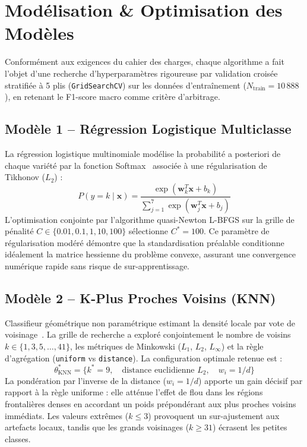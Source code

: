 \documentclass[10pt,a4paper,twocolumn]{article}
\begin{document}
\section{Modélisation \& Optimisation des Modèles}
\label{sec:models}

Conformément aux exigences du cahier des charges, chaque algorithme a fait l'objet d'une recherche d'hyperparamètres rigoureuse par validation croisée stratifiée à 5 plis (\texttt{GridSearchCV}) sur les données d'entraînement ($N_{\text{train}} = 10\,888$), en retenant le F1-score macro comme critère d'arbitrage.

\subsection{Modèle 1 -- Régression Logistique Multiclasse}
La régression logistique multinomiale modélise la probabilité a posteriori de chaque variété par la fonction Softmax~\cite{bishop2006pattern} associée à une régularisation de Tikhonov ($L_2$) :
\begin{equation}
P(y = k \mid \mathbf{x}) = \frac{\exp(\mathbf{w}_k^T \mathbf{x} + b_k)}{\sum_{j=1}^7 \exp(\mathbf{w}_j^T \mathbf{x} + b_j)}
\label{eq:softmax}
\end{equation}
L'optimisation conjointe par l'algorithme quasi-Newton L-BFGS sur la grille de pénalité $C \in \{0.01, 0.1, 1, 10, 100\}$ sélectionne $C^* = 100$. Ce paramètre de régularisation modéré démontre que la standardisation préalable conditionne idéalement la matrice hessienne du problème convexe, assurant une convergence numérique rapide sans risque de sur-apprentissage.

\subsection{Modèle 2 -- K-Plus Proches Voisins (KNN)}
Classifieur géométrique non paramétrique estimant la densité locale par vote de voisinage~\cite{cover1967nearest}. La grille de recherche a exploré conjointement le nombre de voisins $k \in \{1, 3, 5, \dots, 41\}$, les métriques de Minkowski ($L_1$, $L_2$, $L_\infty$) et la règle d'agrégation (\texttt{uniform} vs \texttt{distance}). La configuration optimale retenue est :
\begin{equation}
\theta^*_{\text{KNN}} = \{k^* = 9, \quad \text{distance euclidienne } L_2, \quad w_i = 1/d\}
\end{equation}
La pondération par l'inverse de la distance ($w_i = 1/d$) apporte un gain décisif par rapport à la règle uniforme : elle atténue l'effet de flou dans les régions frontalières denses en accordant un poids prépondérant aux plus proches voisins immédiats. Les valeurs extrêmes ($k \le 3$) provoquent un sur-ajustement aux artefacts locaux, tandis que les grands voisinages ($k \ge 31$) écrasent les petites classes.
\end{document}
